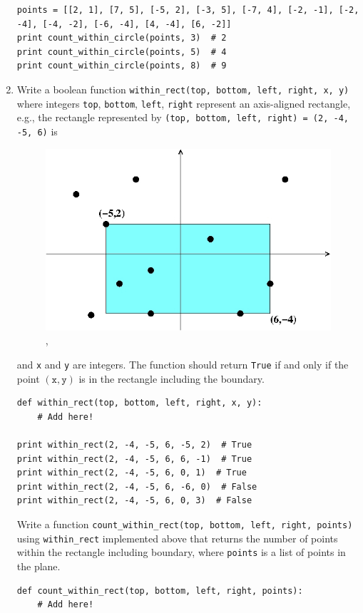 \documentclass[../main.tex]{subfiles}
\begin{document}
\begin{enumerate}
\begin{verbatim}
points = [[2, 1], [7, 5], [-5, 2], [-3, 5], [-7, 4], [-2, -1], [-2, -4], [-4, -2], [-6, -4], [4, -4], [6, -2]]
print count_within_circle(points, 3)  # 2
print count_within_circle(points, 5)  # 4
print count_within_circle(points, 8)  # 9
\end{verbatim}

\item Write a boolean function \texttt{within\_rect(top, bottom, left, right, x, y)} where integers \texttt{top}, \texttt{bottom}, \texttt{left}, \texttt{right} represent an axis-aligned rectangle, e.g., the rectangle represented by \texttt{(top, bottom, left, right) = (2, -4, -5, 6)} is
\begin{figure}[H]
\centering
\includegraphics[width=0.5\linewidth]{"./lectures/lecture4_q11"},
\label{fig:lecture4q11}
\end{figure}
and \texttt{x} and \texttt{y} are integers.
The function should return \texttt{True} if and only if the point $(\texttt{x}, \texttt{y})$ is in the rectangle including the boundary.
\begin{verbatim}
def within_rect(top, bottom, left, right, x, y):
	# Add here!
	
print within_rect(2, -4, -5, 6, -5, 2)  # True
print within_rect(2, -4, -5, 6, 6, -1)  # True
print within_rect(2, -4, -5, 6, 0, 1)  # True
print within_rect(2, -4, -5, 6, -6, 0)  # False
print within_rect(2, -4, -5, 6, 0, 3)  # False
\end{verbatim}
Write a function \texttt{count\_within\_rect(top, bottom, left, right, points)} using \texttt{within\_rect} implemented above that returns the number of points within the rectangle including boundary, where \texttt{points} is a list of points in the plane.
\begin{verbatim}
def count_within_rect(top, bottom, left, right, points):
	# Add here!
	

\end{verbatim}
\end{enumerate}
\end{document}
